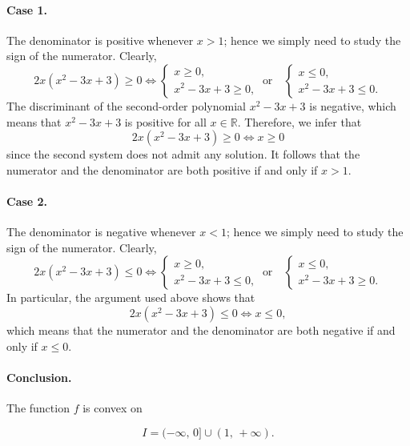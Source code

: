 \documentclass[a4paper,10 pt]{report}
\newcommand{\finalanswer}[1]{%
    \begin{finalAnswer}
    \[
        #1
    \]
    \end{finalAnswer}
}
\theoremstyle{definition}
\newcommand{\R}{\mathbb R}
\begin{document}
\begin{solutionBox}
\paragraph{Case 1.} The denominator is positive whenever $x > 1$; hence we simply need to study the sign of the numerator. Clearly, 
\begin{equation*} 2x(x^2 - 3x + 3) \geq 0 \iff \begin{cases} x \geq 0, \\ x^2 - 3x + 3 \geq 0, \end{cases} \: \text{or} \quad \begin{cases} x \leq 0, \\ x^2 - 3x + 3 \leq 0. \end{cases} \end{equation*}
The discriminant of the second-order polynomial $x^2 - 3x + 3$ is negative, which means that $x^2 - 3x + 3$ is positive for all $x \in \R$. Therefore, we infer that
\begin{equation*} 2x(x^2 - 3x + 3) \geq 0 \iff x \geq 0\end{equation*}
since the second system does not admit any solution. It follows that the numerator and the denominator are both positive if and only if $x > 1$.

\paragraph{Case 2.} The denominator is negative whenever $x < 1$; hence we simply need to study the sign of the numerator. Clearly, 
\begin{equation*} 2x(x^2 - 3x + 3) \leq 0 \iff \begin{cases} x \geq 0, \\ x^2 - 3x + 3 \leq 0, \end{cases} \: \text{or} \quad \begin{cases} x \leq 0, \\ x^2 - 3x + 3 \geq 0. \end{cases} \end{equation*}
In particular, the argument used above shows that
\begin{equation*} 2x(x^2 - 3x + 3) \leq 0 \iff x \leq 0,\end{equation*}
which means that the numerator and the denominator are both negative if and only if $x \leq 0$.

\paragraph{Conclusion.} The function $f$ is convex on
\finalanswer{
  I = (- \infty, \, 0] \cup (1, \, + \infty).
} 
\end{solutionBox}
\end{document}
